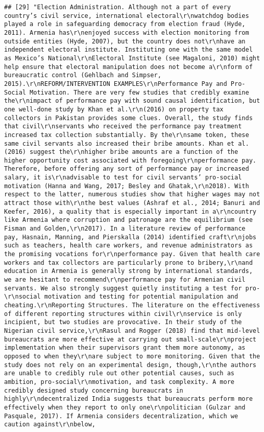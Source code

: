\documentclass[
]{article}
\begin{document}
\begin{verbatim}
## [29] "Election Administration. Although not a part of every country’s civil service, international electoral\r\nwatchdog bodies played a role in safeguarding democracy from election fraud (Hyde, 2011). Armenia has\r\nenjoyed success with election monitoring from outside entities (Hyde, 2007), but the country does not\r\nhave an independent electoral institute. Instituting one with the same model as Mexico’s National\r\nElectoral Institute (see Magaloni, 2010) might help ensure that electoral manipulation does not become a\r\nform of bureaucratic control (Gehlbach and Simpser, 2015).\r\nREFORM/INTERVENTION EXAMPLES\r\nPerformance Pay and Pro-Social Motivation. There are very few studies that credibly examine the\r\nimpact of performance pay with sound causal identification, but one well-done study by Khan et al.\r\n(2016) on property tax collectors in Pakistan provides some clues. Overall, the study finds that civil\r\nservants who received the performance pay treatment increased tax collection substantially. By the\r\nsame token, these same civil servants also increased their bribe amounts. Khan et al. (2016) suggest the\r\nhigher bribe amounts are a function of the higher opportunity cost associated with foregoing\r\nperformance pay. Therefore, before offering any sort of performance pay or increased salary, it is\r\nadvisable to test for civil servants’ pro-social motivation (Hanna and Wang, 2017; Besley and Ghatak,\r\n2018). With respect to the latter, numerous studies show that higher wages may not attract those with\r\nthe best values (Ashraf et al., 2014; Banuri and Keefer, 2016), a quality that is especially important in a\r\ncountry like Armenia where corruption and patronage are the equilibrium (see Fisman and Golden,\r\n2017). In a literature review of performance pay, Hasnain, Manning, and Pierskalla (2014) identified craft\r\njobs such as teachers, health care workers, and revenue administrators as the promising vocations for\r\nperformance pay. Given that health care workers and tax collectors are particularly prone to bribery,\r\nand education in Armenia is generally strong by international standards, we are hesitant to recommend\r\nperformance pay for Armenian civil servants. We also strongly suggest quietly instituting a test for pro-\r\nsocial motivation and testing for potential manipulation and cheating.\r\nReporting Structures. The literature on the effectiveness of different reporting structures within civil\r\nservice is only incipient, but two studies are provocative. In their study of the Nigerian civil service,\r\nRasul and Rogger (2018) find that mid-level bureaucrats are more effective at carrying out small-scale\r\nproject implementation when their supervisors grant them more autonomy, as opposed to when they\r\nare subject to more monitoring. Given that the study does not rely on an experimental design, though,\r\nthe authors are unable to credibly rule out other potential causes, such as ambition, pro-social\r\nmotivation, and task complexity. A more credibly designed study concerning bureaucrats in highly\r\ndecentralized India suggests that bureaucrats perform more effectively when they report to only one\r\npolitician (Gulzar and Pasquale, 2017). If Armenia considers decentralization, which we caution against\r\nbelow, 
\end{verbatim}
\end{document}
